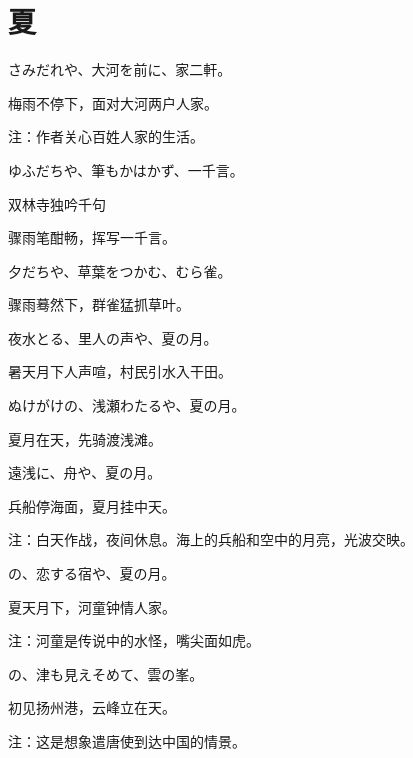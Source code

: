 \section{\FK 夏}

\setcounter{haikucounter}{0}

\begin{haiku}
    {\FH さみだれや、大河を前に、家二軒。}

    {\FK 梅雨不停下，面对大河两户人家。}

    {\FT 注：作者关心百姓人家的生活。}
\end{haiku}

\begin{haiku}
    {\FH ゆふだちや、筆もかはかず、一千言。}

    {\FK 双林寺独吟千句}

    {\FK 骤雨笔酣畅，挥写一千言。}
\end{haiku}

\begin{haiku}
    {\FH 夕だちや、草葉をつかむ、むら雀。}

    {\FK 骤雨蓦然下，群雀猛抓草叶。}
\end{haiku}

\begin{haiku}
    {\FH 夜水とる、里人の声や、夏の月。}

    {\FK 暑天月下人声喧，村民引水入干田。}
\end{haiku}

\begin{haiku}
    {\FH ぬけがけの、浅瀬わたるや、夏の月。}

    {\FK 夏月在天，先骑渡浅滩。}
\end{haiku}

\begin{haiku}
    {\FH 遠浅に、舟や、夏の月。}

    {\FK 兵船停海面，夏月挂中天。}

    {\FT 注：白天作战，夜间休息。海上的兵船和空中的月亮，光波交映。}
\end{haiku}

\begin{haiku}
    {\FH {}の、恋する宿や、夏の月。}

    {\FK 夏天月下，河童钟情人家。}

    {\FT 注：河童是传说中的水怪，嘴尖面如虎。}
\end{haiku}

\begin{haiku}
    {\FH {}の、津も見えそめて、雲の峯。}

    {\FK 初见扬州港，云峰立在天。}

    {\FT 注：这是想象遣唐使到达中国的情景。}
\end{haiku}

